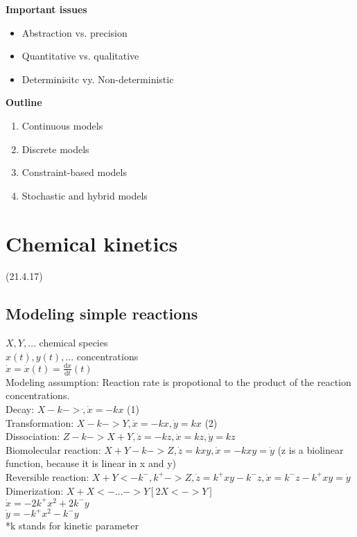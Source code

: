     \textbf{Important issues}
    \begin{itemize}
      \item Abstraction vs. precision
      \item Quantitative vs. qualitative
      \item Determinisitc vy. Non-deterministic
    \end{itemize}

    \textbf{Outline}
    \begin{enumerate}
      \item Continuous models
      \item Discrete models
      \item Constraint-based models
      \item Stochastic and hybrid models
    \end{enumerate}

  \chapter{Chemical kinetics}
    \begin{lecture}
      (21.4.17)
    \end{lecture}
    \section{Modeling simple reactions}
      $X, Y, \dots $ chemical species \\
      $x(t), y(t), \dots $ concentrations \\
      $\dot{x} = \dot{x}(t) = \frac{\mathrm d x}{\mathrm d t} (t)$ \\
      Modeling assumption: Reaction rate is propotional to the product of the reaction concentrations. \\
      Decay: $X -k-> \dot , \dot{x}=-kx$ (1) \\
      Transformation: $X -k-> Y, \dot{x}=-kx, \dot{y}=kx$ (2) \\
      Dissociation: $Z -k-> X+Y, \dot{z}=-kz, \dot{x}=kz, \dot{y}=kz$ \\
      Biomolecular reaction: $X+Y -k-> Z, \dot{z}=kxy, \dot{x}=-kxy = \dot{y}$ (z is a biolinear function, because it is linear in x and y) \\
      Reversible reaction: $X+Y <-k^-, k^+ -> Z, \dot{z}=k^+ xy-k^- z, \dot{x} = k^- z-k^+ xy = \dot{y}$ \\
      Dimerization: $X+X <-…-> Y [2X <-> Y]$ \\
      $\dot{x} = -2k^+ x^2 + 2k^- y$ \\
      $\dot{y} = -k^+ x^2 - k^- y$ \\
      *k stands for kinetic parameter \\




